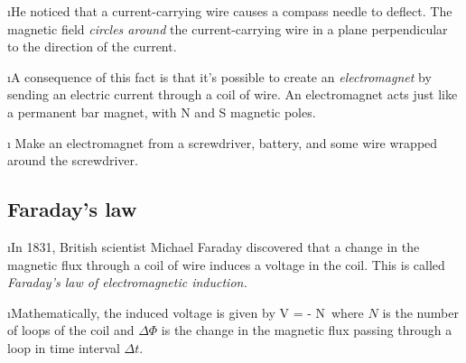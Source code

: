 \i He noticed that a current-carrying wire causes a compass 
needle to deflect.
The magnetic field {\em circles around} the current-carrying wire 
in a plane perpendicular to the direction of the current.

\i A consequence of this fact is that it's possible to create an 
{\em electromagnet} by sending an electric current through a coil of wire.
An electromagnet acts just like a permanent bar magnet, with N and S 
magnetic poles.

\i \demo
Make an electromagnet from a screwdriver, battery, and
some wire wrapped around the screwdriver.

\ei

\subsection{Faraday's law}

\bi

\i In  1831, British scientist Michael Faraday discovered 
that a change in the magnetic flux through a coil of wire 
induces a voltage in the coil.
This is called {\em Faraday's law of electromagnetic induction.}

\i Mathematically, the induced voltage is given by
%
\be
V = - N\,
\ee
%
where $N$ is the number of loops of the coil and $\Delta\Phi$ 
is the change in the magnetic flux 
passing through a loop in time interval $\Delta t$.

